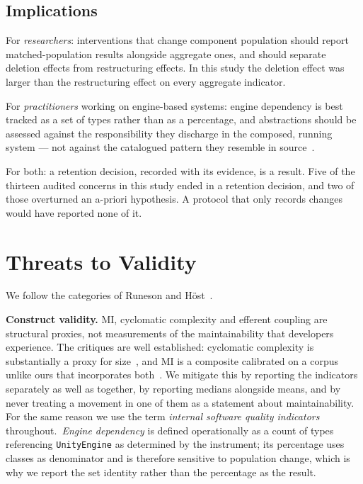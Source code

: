 \documentclass{sbc2019}%
\begin{document}
\subsection{Implications}

For \emph{researchers}: interventions that change component population should
report matched-population results alongside aggregate ones, and should separate
deletion effects from restructuring effects. In this study the deletion effect
was larger than the restructuring effect on every aggregate indicator.

For \emph{practitioners} working on engine-based systems: engine dependency is
best tracked as a set of types rather than as a percentage, and abstractions
should be assessed against the responsibility they discharge in the composed,
running system --- not against the catalogued pattern they resemble in
source~\cite{gamma1995}.

For both: a retention decision, recorded with its evidence, is a result. Five of the thirteen audited
concerns in this study ended in a retention decision, and two of those
overturned an a-priori hypothesis. A protocol that only records changes would have reported
none of it.


\section{Threats to Validity}\label{sec:threats}

We follow the categories of Runeson and H\"ost~\cite{runeson2009}.

\medskip\noindent\textbf{Construct validity.} MI, cyclomatic complexity and
efferent coupling are structural proxies, not measurements of the maintainability
that developers experience. The critiques are well established: cyclomatic
complexity is substantially a proxy for size~\cite{shepperd1988}, and MI is a
composite calibrated on a corpus unlike ours that incorporates
both~\cite{coleman1994,ardito2020}. We mitigate this by reporting the indicators
separately as well as together, by reporting medians alongside means, and by
never treating a movement in one of them as a statement about maintainability.
For the same reason we use the term \emph{internal software quality indicators}
throughout.\ \emph{Engine dependency} is defined operationally as a count of types
referencing \texttt{UnityEngine} as determined by the instrument; its percentage
uses classes as denominator and is therefore sensitive to population change, which
is why we report the set identity rather than the percentage as the result.
\end{document}
